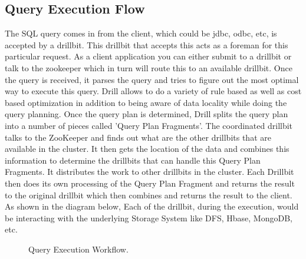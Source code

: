 \documentclass[9pt,twocolumn,twoside]{styles/osajnl}
\begin{document}
\subsection{Query Execution Flow}
The SQL query comes in from the client, which could be jdbc, odbc, etc, is accepted by a drillbit. This drillbit that accepts this acts as a foreman for this particular request. As a client application you can either submit to a drillbit or talk to the zookeeper which in turn will route this to an available drillbit. Once the query is received, it parses the query and tries to figure out the most optimal way to execute this query. Drill allows to do a variety of rule based as well as cost based optimization in addition to being aware of data locality while doing the query planning. Once the query plan is determined, Drill splits the query plan into a number of pieces called 'Query Plan Fragments'. The coordinated drillbit talks to the ZooKeeper and finds out what are the other drillbits that are available in the cluster. It then gets the location of the data and combines this information to determine the drillbits that can handle this Query Plan Fragments. It distributes the work to other drillbits in the cluster. Each Drillbit then does its own processing of the Query Plan Fragment and returns the result to the original drillbit which then combines and returns the result to the client. As shown in the diagram below, Each of the drillbit, during the execution, would be interacting with the underlying Storage System like DFS, Hbase, MongoDB, etc.

\begin{figure}[htbp]
	\centering
	\caption{Query Execution Workflow.}
	\label{fig:Drill-arch}
\end{figure}
\end{document}
